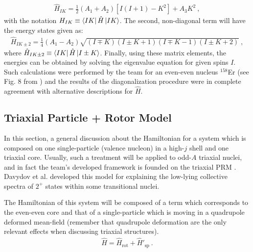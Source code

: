 \begin{align}
    \hat{H}_{IK}=\frac{1}{2}(A_1+A_2)\left[I(I+1)-K^2\right]+A_3K^2\ ,
\end{align}
with the notation $H_{IK}\equiv\bra{IK}\hat{H}\ket{IK}$. The second, non-diagonal term will have the energy states given as:
\begin{align}
    \hat{H}_{IK\pm2}=\frac{1}{4}(A_1-A_2)\sqrt{(I\mp K)(I\pm K +1)(I \mp K -1)(I\pm K +2)}\ ,
\end{align}
where $\hat{H}_{IK\pm 2}\equiv \bra{IK}\hat{H}\ket{I\pm K}$. Finally, using these matrix elements, the energies can be obtained by solving the eigenvalue equation for given spins $I$. Such calculations were performed by the team for an even-even nucleus $^{158}$Er (see Fig. 8 from  \cite{raduta2017semiclassical}) and the results of the diagonalization procedure were in complete agreement with alternative descriptions for $\hat{H}$.

\subsection{Triaxial Particle + Rotor Model}

In this section, a general discussion about the Hamiltonian for a system which is composed on one single-particle (valence nucleon) in a high-$j$ shell and one triaxial core. Usually, such a treatment will be applied to odd-$A$ triaxial nuclei, and in fact the team's developed framework is founded on the triaxial PRM \cite{davydov1958rotational}. Davydov et al. developed this model for explaining the low-lying collective spectra of $2^+$ states within some transitional nuclei.

The Hamiltonian of this system will be composed of a term which corresponds to the even-even core and that of a single-particle which is moving in a quadrupole deformed mean-field (remember that quadrupole deformation are the only relevant effects when discussing triaxial structures).
\begin{align}
    \hat{H}=\hat{H}_\text{rot}+\hat{H}'_\text{sp}\ .
\end{align}

